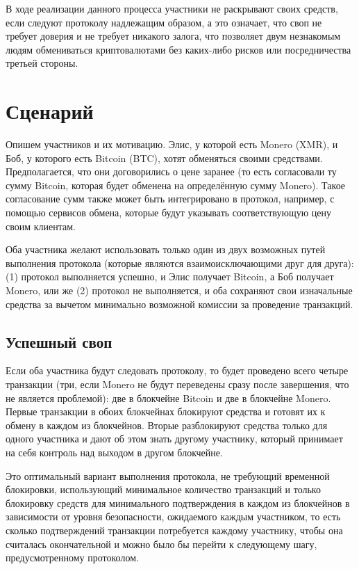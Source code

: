 \documentclass{llncs}
\begin{document}
В ходе реализации данного процесса участники не раскрывают своих средств, если следуют протоколу надлежащим образом, а это означает, что своп не требует доверия и не требует никакого залога, что позволяет двум незнакомым людям обмениваться криптовалютами без каких-либо рисков или посредничества третьей стороны.

\section{Сценарий}
Опишем участников и их мотивацию. Элис, у которой есть Monero (XMR), и Боб, у которого есть Bitcoin (BTC), хотят обменяться своими средствами. Предполагается, что они договорились о цене заранее (то есть согласовали ту сумму Bitcoin, которая будет обменена на определённую сумму Monero). Такое согласование сумм также может быть интегрировано в протокол, например, с помощью сервисов обмена, которые будут указывать соответствующую цену своим клиентам.

Оба участника желают использовать только один из двух возможных путей выполнения протокола (которые являются взаимоисключающими друг для друга): (1) протокол выполняется успешно, и Элис получает Bitcoin, а Боб получает Monero, или же (2) протокол не выполняется, и оба сохраняют свои изначальные средства за вычетом минимально возможной комиссии за проведение транзакций.

\subsection{Успешный своп}
Если оба участника будут следовать протоколу, то будет проведено всего четыре транзакции (три, если Monero не будут переведены сразу после завершения, что не является проблемой): две в блокчейне Bitcoin и две в блокчейне Monero. Первые транзакции в обоих блокчейнах блокируют средства и готовят их к обмену в каждом из блокчейнов. Вторые разблокируют средства только для одного участника и дают об этом знать другому участнику, который принимает на себя контроль над выходом в другом блокчейне.

Это оптимальный вариант выполнения протокола, не требующий временной блокировки, использующий минимальное количество транзакций и только блокировку средств для минимального подтверждения в каждом из блокчейнов в зависимости от уровня безопасности, ожидаемого каждым участником, то есть сколько подтверждений транзакции потребуется каждому участнику, чтобы она считалась окончательной и можно было бы перейти к следующему шагу, предусмотренному протоколом.
\end{document}
